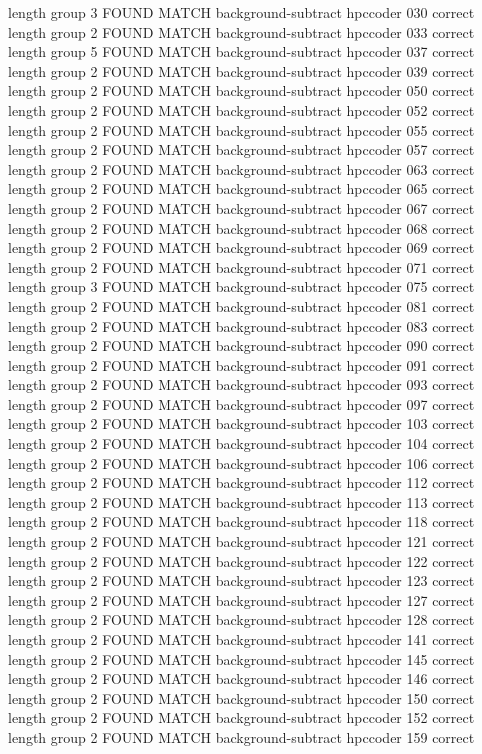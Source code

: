 length group  3
FOUND MATCH background-subtract hpccoder 030 correct
length group  2
FOUND MATCH background-subtract hpccoder 033 correct
length group  5
FOUND MATCH background-subtract hpccoder 037 correct
length group  2
FOUND MATCH background-subtract hpccoder 039 correct
length group  2
FOUND MATCH background-subtract hpccoder 050 correct
length group  2
FOUND MATCH background-subtract hpccoder 052 correct
length group  2
FOUND MATCH background-subtract hpccoder 055 correct
length group  2
FOUND MATCH background-subtract hpccoder 057 correct
length group  2
FOUND MATCH background-subtract hpccoder 063 correct
length group  2
FOUND MATCH background-subtract hpccoder 065 correct
length group  2
FOUND MATCH background-subtract hpccoder 067 correct
length group  2
FOUND MATCH background-subtract hpccoder 068 correct
length group  2
FOUND MATCH background-subtract hpccoder 069 correct
length group  2
FOUND MATCH background-subtract hpccoder 071 correct
length group  3
FOUND MATCH background-subtract hpccoder 075 correct
length group  2
FOUND MATCH background-subtract hpccoder 081 correct
length group  2
FOUND MATCH background-subtract hpccoder 083 correct
length group  2
FOUND MATCH background-subtract hpccoder 090 correct
length group  2
FOUND MATCH background-subtract hpccoder 091 correct
length group  2
FOUND MATCH background-subtract hpccoder 093 correct
length group  2
FOUND MATCH background-subtract hpccoder 097 correct
length group  2
FOUND MATCH background-subtract hpccoder 103 correct
length group  2
FOUND MATCH background-subtract hpccoder 104 correct
length group  2
FOUND MATCH background-subtract hpccoder 106 correct
length group  2
FOUND MATCH background-subtract hpccoder 112 correct
length group  2
FOUND MATCH background-subtract hpccoder 113 correct
length group  2
FOUND MATCH background-subtract hpccoder 118 correct
length group  2
FOUND MATCH background-subtract hpccoder 121 correct
length group  2
FOUND MATCH background-subtract hpccoder 122 correct
length group  2
FOUND MATCH background-subtract hpccoder 123 correct
length group  2
FOUND MATCH background-subtract hpccoder 127 correct
length group  2
FOUND MATCH background-subtract hpccoder 128 correct
length group  2
FOUND MATCH background-subtract hpccoder 141 correct
length group  2
FOUND MATCH background-subtract hpccoder 145 correct
length group  2
FOUND MATCH background-subtract hpccoder 146 correct
length group  2
FOUND MATCH background-subtract hpccoder 150 correct
length group  2
FOUND MATCH background-subtract hpccoder 152 correct
length group  2
FOUND MATCH background-subtract hpccoder 159 correct
